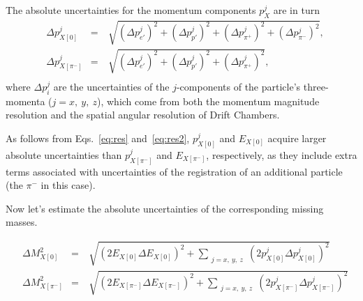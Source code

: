 The absolute uncertainties for the momentum components $p_{X}^{j}$ are in turn\vspace{-0.5em}
\begin{equation}
\begin{aligned}
&\Delta p_{X[0]}^{j} &=&~\sqrt{ \left ( \Delta p_{e'}^{j} \right )^{2} + \left ( \Delta p_{p'}^{j} \right )^{2} +  \left ( \Delta p_{\pi^{+}}^{j} \right )^{2} + \left ( \Delta p_{\pi^{-}}^{j} \right )^{2}}, \\
&\Delta p_{X[\pi^{-}]}^{j} &=&~\sqrt{ \left ( \Delta p_{e'}^{j} \right )^{2} + \left ( \Delta p_{p'}^{j} \right )^{2} +  \left ( \Delta p_{\pi^{+}}^{j} \right )^{2}},\\[-7pt]
\end{aligned}\label{eq:res2}
\end{equation}
where $\Delta p_{i}^{j}$ are the uncertainties of the $j$-components of the particle's three-momenta ($j = x,~y,~z$), which come from both the momentum magnitude resolution and the spatial angular resolution of Drift Chambers.


As follows from Eqs.~\eqref{eq:res} and~\eqref{eq:res2}, $p_{X[0]}^{j}$ and $E_{X[0]}$ acquire larger absolute uncertainties than $p_{X[\pi^{-}]}^{j}$ and $E_{X[\pi^{-}]}$, respectively, as they include extra terms associated with uncertainties of the registration of an additional particle (the $\pi^{-}$ in this case).

Now let's estimate the absolute uncertainties of the corresponding missing masses.\vspace{-0.5em}

\begin{equation}
\begin{aligned}
&\Delta M_{X[0]}^{2} &=&~\sqrt{ \left (2E_{X[0]} \Delta E_{X[0]} \right )^{2} + \sum_{\substack{j = x,~y,~z}}\left (2p_{X[0]}^{j} \Delta p_{X[0]}^{j} \right )^{2}} \\
&\Delta M_{X[\pi^{-}]}^{2} &=&~\sqrt{ \left (2E_{X[\pi^{-}]} \Delta E_{X[\pi^{-}]} \right )^{2} +  \sum_{\substack{j = x,~y,~z}}\left (2p_{X[\pi^{-}]}^{j} \Delta p_{X[\pi^{-}]}^{j} \right )^{2}} \\[-7pt]
\end{aligned}\label{eq:res3}
\end{equation}

